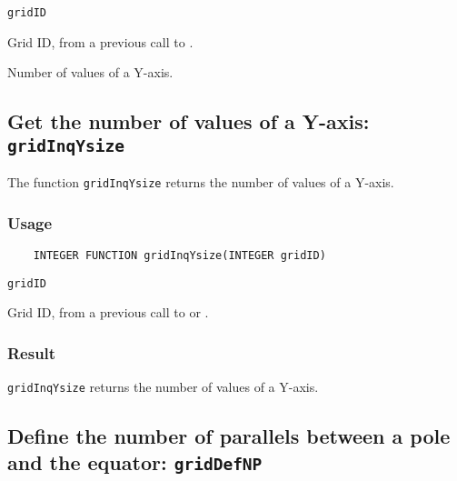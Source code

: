 \hspace*{4mm}\begin{minipage}[]{15cm}
\begin{deflist}{\tt gridID\ }
\item[{\tt gridID}]
Grid ID, from a previous call to {}.
\item[{\tt ysize}]
Number of values of a Y-axis.

\end{deflist}
\end{minipage}


\subsection{Get the number of values of a Y-axis: {\tt gridInqYsize}}
\label{gridInqYsize}

The function {\tt gridInqYsize} returns the number of values of a Y-axis.

\subsubsection*{Usage}

\begin{verbatim}
    INTEGER FUNCTION gridInqYsize(INTEGER gridID)
\end{verbatim}

\hspace*{4mm}\begin{minipage}[]{15cm}
\begin{deflist}{\tt gridID\ }
\item[{\tt gridID}]
Grid ID, from a previous call to {} or {}.

\end{deflist}
\end{minipage}

\subsubsection*{Result}

{\tt gridInqYsize} returns the number of values of a Y-axis.



\subsection{Define the number of parallels between a pole and the equator: {\tt gridDefNP}}
\label{gridDefNP}

